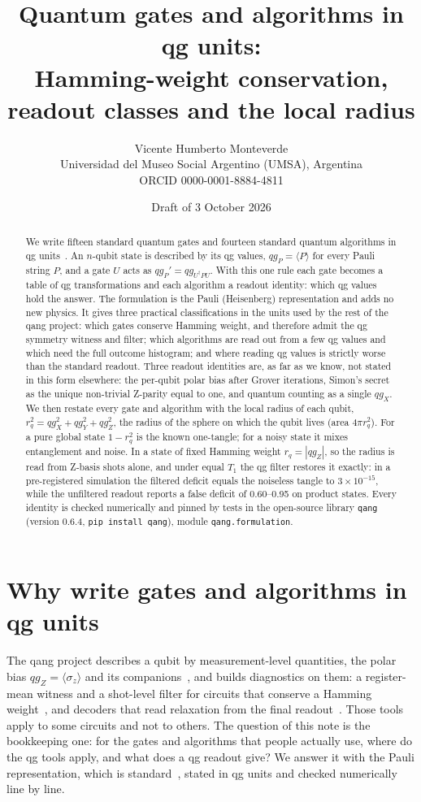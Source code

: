 \documentclass[11pt]{article}
\title{Quantum gates and algorithms in qg units:\\
Hamming-weight conservation, readout classes and the local radius}
\author{Vicente Humberto Monteverde\\
\small Universidad del Museo Social Argentino (UMSA), Argentina\\
\small ORCID 0000-0001-8884-4811}
\date{\small Draft of 3 October 2026}
\newcommand{\q}[1]{qg_{#1}}
\newcommand{\qZ}{qg_Z}
\newcommand{\qX}{qg_X}
\newcommand{\qY}{qg_Y}
\begin{document}
\sloppy
\maketitle

\begin{abstract}
We write fifteen standard quantum gates and fourteen standard quantum algorithms in qg
units~\cite{monteverde2026qang}. An $n$-qubit state is described by its qg values,
$\q{P}=\langle P\rangle$ for every Pauli string $P$, and a gate $U$ acts as $\q{P}'=\q{U^\dagger PU}$. With this one
rule each gate becomes a table of qg transformations and each algorithm a readout identity: which qg values
hold the answer. The formulation is the Pauli (Heisenberg) representation and adds no new physics. It
gives three practical classifications in the units used by the rest of the qang project: which gates
conserve Hamming weight, and therefore admit the qg symmetry witness and filter; which algorithms are read
out from a few qg values and which need the full outcome histogram; and where reading qg values is strictly
worse than the standard readout. Three readout identities are, as far as we know, not stated in this
form elsewhere: the per-qubit polar bias after Grover iterations, Simon's secret as the unique non-trivial
Z-parity equal to one, and quantum counting as a single $\qX$. We then restate every gate and algorithm
with the local radius of each qubit, $r_q^2=\qX^2+\qY^2+\qZ^2$, the radius of the sphere on which the qubit lives
(area $4\pi r_q^2$). For a pure global state $1-r_q^2$ is the known one-tangle; for a noisy state it mixes
entanglement and noise. In a state of fixed Hamming weight $r_q=|\qZ|$, so the radius is read from Z-basis shots
alone, and under equal $T_1$ the qg filter restores it exactly: in a pre-registered simulation the filtered deficit
equals the noiseless tangle to $3\times10^{-15}$, while the unfiltered readout reports a false deficit of 0.60--0.95
on product states. Every identity is checked numerically and pinned by tests in the open-source library
\texttt{qang} (version 0.6.4, \texttt{pip install qang}), module \texttt{qang.formulation}.
\end{abstract}

\section{Why write gates and algorithms in qg units}

The qang project describes a qubit by measurement-level quantities, the polar bias $\qZ=\langle\sigma_z\rangle$
and its companions~\cite{monteverde2026qang}, and builds diagnostics on them: a register-mean witness and a
shot-level filter for circuits that conserve a Hamming weight~\cite{monteverde2026witness}, and decoders that
read relaxation from the final readout~\cite{monteverde2026leakage}. Those tools apply to some circuits and not
to others. The question of this note is the bookkeeping one: for the gates and algorithms that people actually
use, where do the qg tools apply, and what does a qg readout give? We answer it with the Pauli representation,
which is standard~\cite{gottesman1998,nielsen2010quantum}, stated in qg units and checked numerically line by
line.
\end{document}
